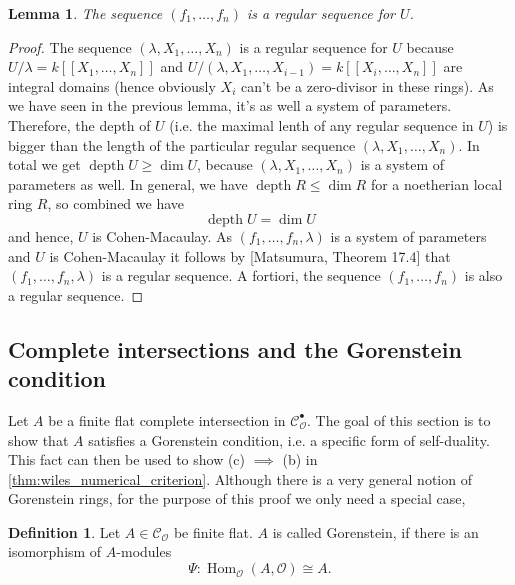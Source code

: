 \documentclass{article}
\theoremstyle{plain}%
\newtheorem{lemma}{Lemma}[section]
\theoremstyle{definition}
\newtheorem{definition}{Definition}[section]
\theoremstyle{remark}
\newcommand{\cob}{\mathcal{C}_\mathcal{O}^\bullet}
\newcommand{\co}{\mathcal{C}_\mathcal{O}}
\renewcommand{\hom}{\operatorname{Hom}}
\begin{document}
    \begin{lemma}\label{lem:reg_seq}
        The sequence \((f_1, \dots, f_n)\) is a regular sequence for \(U\).
    \end{lemma}
    \begin{proof}
        The sequence \((\lambda, X_1, \dots, X_n)\) is a regular sequence for \(U\) because
        \(U/\lambda = k[[X_1, \dots, X_n]]\) and \(U/(\lambda, X_1, \dots, X_{i-1}) = k[[X_i, \dots, X_n]]\) 
        are integral domains (hence obviously \(X_i\) can't be a zero-divisor in these rings).
        As we have seen in the previous lemma, it's as well a system of parameters.
        Therefore, the depth of \(U\) (i.e. the maximal lenth of any regular sequence in \(U\)) is bigger than
        the length of the particular regular sequence \((\lambda, X_1, \dots, X_n)\).
        In total we get \(\operatorname{depth} U \geq \dim U\), because \((\lambda, X_1, \dots, X_n)\) 
        is a system of parameters as well.
        In general, we have \(\operatorname{depth} R \leq \dim R\) for a noetherian local ring \(R\), 
        so combined we have
        \[
            \operatorname{depth} U = \dim U  
        \]
        and hence, \(U\) is Cohen-Macaulay.
        As \((f_1, \dots, f_n, \lambda)\) is a system of parameters and \(U\) is Cohen-Macaulay
        it follows by [Matsumura, Theorem 17.4] that \((f_1, \dots, f_n, \lambda)\) is a regular sequence.
        A fortiori, the sequence \((f_1, \dots, f_n)\) is also a regular sequence.
    \end{proof}

    \subsection{Complete intersections and the Gorenstein condition}
    Let \(A\) be a finite flat complete intersection in \(\cob\). The goal of this section is to show that \(A\)
    satisfies a Gorenstein condition, i.e. a specific form of self-duality.
    This fact can then be used to show (c) \(\implies\) (b) in \cref{thm:wiles_numerical_criterion}.
    Although there is a very general notion of Gorenstein rings, for
    the purpose of this proof we only need a special case,
    \begin{definition}
        Let \(A \in \co\) be finite flat. \(A\) is called Gorenstein, if there is an isomorphism of \(A\)-modules
        \[
            \Psi\colon \hom_\mathcal{O}(A, \mathcal{O}) \cong A.
        \]
    \end{definition}
    
\end{document}
